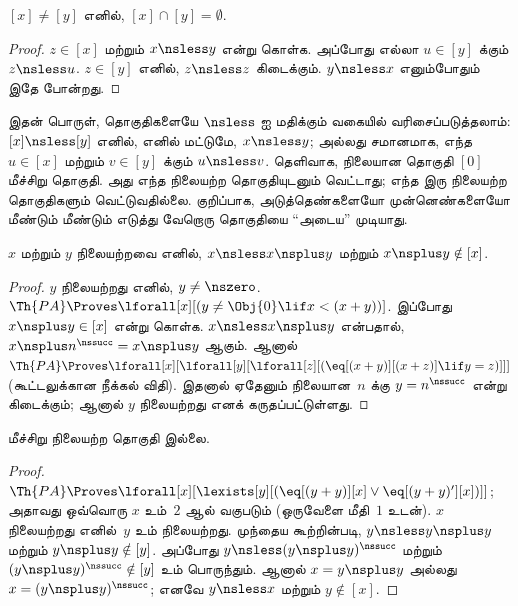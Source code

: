 \documentclass[../../../include/open-logic-section]{subfiles}
\begin{document}
\begin{cor}
$[x] \neq [y]$ எனில், $[x] \cap [y] = \emptyset$.
\end{cor}

\begin{proof}
$z \in [x]$ மற்றும் $x \nsless y$ என்று கொள்க. அப்போது எல்லா
$u
\in [y]$ க்கும் $z \nsless u$. $z \in [y]$ எனில்,
$z \nsless z$ கிடைக்கும். $y
\nsless x$ எனும்போதும் இதே போன்றது.
\end{proof}

\begin{explain}
இதன் பொருள், தொகுதிகளையே $\nsless$ ஐ மதிக்கும் வகையில்
வரிசைப்படுத்தலாம்: $[x] \nsless [y]$ எனில், எனில் மட்டுமே,
$x \nsless y$; அல்லது சமானமாக, எந்த $u \in [x]$ மற்றும்
$v \in [y]$ க்கும் $u \nsless v$. தெளிவாக, நிலையான தொகுதி $[0]$
மீச்சிறு தொகுதி. அது எந்த நிலையற்ற தொகுதியுடனும் வெட்டாது; எந்த இரு
நிலையற்ற தொகுதிகளும் வெட்டுவதில்லை. குறிப்பாக, அடுத்தெண்களையோ
முன்னெண்களையோ மீண்டும் மீண்டும் எடுத்து வேறொரு தொகுதியை
``அடைய'' முடியாது.
\end{explain}

\begin{prop}
$x$ மற்றும் $y$ நிலையற்றவை எனில், $x \nsless x \nsplus y$ மற்றும்
$x
\nsplus y \notin [x]$.
\end{prop}

\begin{proof}
$y$ நிலையற்றது எனில், $y \neq \nszero$.
$\Th{PA} \Proves
\lforall[x][(y \neq \Obj{0} \lif x < (x+y))]$. இப்போது
$x
\nsplus y \in [x]$ என்று கொள்க. $x \nsless x \nsplus y$ என்பதால்,
$x
\nsplus n^\nssucc = x \nsplus y$ ஆகும். ஆனால்
$\Th{PA} \Proves
\lforall[x][\lforall[y][\lforall[z][(\eq[(x+y)][(x+z)] \lif y = z)]]]$
(கூட்டலுக்கான நீக்கல் விதி). இதனால் ஏதேனும் நிலையான~$n$ க்கு
$y = n^\nssucc$ என்று கிடைக்கும்; ஆனால் $y$ நிலையற்றது எனக்
கருதப்பட்டுள்ளது.
\end{proof}

\begin{prop}
மீச்சிறு நிலையற்ற தொகுதி இல்லை.
\end{prop}

\begin{proof}
$\Th{PA} \Proves \lforall[x][\lexists[y][(\eq[(y+y)][x] \lor
      \eq[(y+y)'][x])]]$; அதாவது ஒவ்வொரு $x$ உம்~$2$ ஆல்
வகுபடும் (ஒருவேளை மீதி~$1$ உடன்). $x$ நிலையற்றது எனில்~$y$ உம்
நிலையற்றது. முந்தைய கூற்றின்படி, $y \nsless y \nsplus y$ மற்றும்
$y \nsplus y
  \notin [y]$. அப்போது $y \nsless (y \nsplus y)^\nssucc$ மற்றும்
$(y
  \nsplus y)^\nssucc \notin [y]$ உம் பொருந்தும். ஆனால்
$x = y \nsplus y$ அல்லது $x = (y
  \nsplus y)^\nssucc$; எனவே $y \nsless x$ மற்றும் $y \notin [x]$.
\end{proof}
\end{document}
